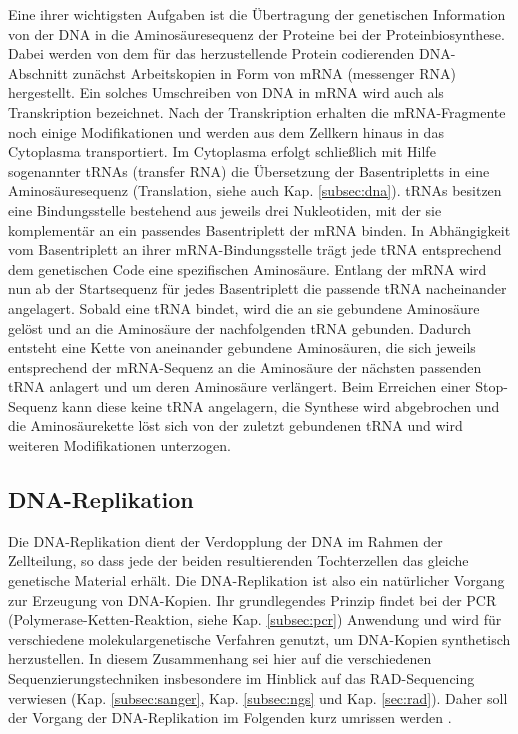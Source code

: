 Eine ihrer wichtigsten Aufgaben ist die Übertragung der genetischen Information von der DNA in die Aminosäuresequenz der Proteine bei der Proteinbiosynthese. Dabei werden von dem für das herzustellende Protein codierenden DNA-Abschnitt zunächst Arbeitskopien in Form von mRNA (messenger RNA) hergestellt. Ein solches Umschreiben von DNA in mRNA wird auch als Transkription bezeichnet. Nach der Transkription erhalten die mRNA-Fragmente noch einige Modifikationen und werden aus dem Zellkern hinaus in das Cytoplasma transportiert. Im Cytoplasma erfolgt schließlich mit Hilfe sogenannter tRNAs (transfer RNA) die Übersetzung der Basentripletts in eine Aminosäuresequenz (Translation, siehe auch Kap. \ref{subsec:dna}). tRNAs besitzen eine Bindungsstelle bestehend aus jeweils drei Nukleotiden, mit der sie komplementär an ein passendes Basentriplett der mRNA binden. In Abhängigkeit vom Basentriplett an ihrer mRNA-Bindungsstelle trägt jede tRNA entsprechend dem genetischen Code eine spezifischen Aminosäure. Entlang der mRNA wird nun ab der Startsequenz für jedes Basentriplett die passende tRNA nacheinander angelagert. Sobald eine tRNA bindet, wird die an sie gebundene Aminosäure gelöst und an die Aminosäure der nachfolgenden tRNA gebunden. Dadurch entsteht eine Kette von aneinander gebundene Aminosäuren, die sich jeweils entsprechend der mRNA-Sequenz an die Aminosäure der nächsten passenden tRNA anlagert und um deren Aminosäure verlängert. Beim Erreichen einer Stop-Sequenz kann diese keine tRNA angelagern, die Synthese wird abgebrochen und die Aminosäurekette löst sich von der zuletzt gebundenen tRNA und wird weiteren Modifikationen unterzogen. \\

\subsection{DNA-Replikation} \label{subsec:replication}

Die DNA-Replikation dient der Verdopplung der DNA im Rahmen der Zellteilung, so dass jede der beiden resultierenden Tochterzellen das gleiche genetische Material erhält. Die DNA-Replikation ist also ein natürlicher Vorgang zur Erzeugung von DNA-Kopien. Ihr grundlegendes Prinzip findet bei der PCR (Polymerase-Ketten-Reaktion, siehe Kap. \ref{subsec:pcr}) Anwendung und wird für verschiedene molekulargenetische Verfahren genutzt, um DNA-Kopien synthetisch herzustellen. In diesem Zusammenhang sei hier auf die verschiedenen Sequenzierungstechniken insbesondere im Hinblick auf das RAD-Sequencing verwiesen (Kap. \ref{subsec:sanger}, Kap. \ref{subsec:ngs} und Kap. \ref{sec:rad}). Daher soll der Vorgang der DNA-Replikation im Folgenden kurz umrissen werden \cite{odonell_2013, chargin_2010, prioleau_2016}. \\

